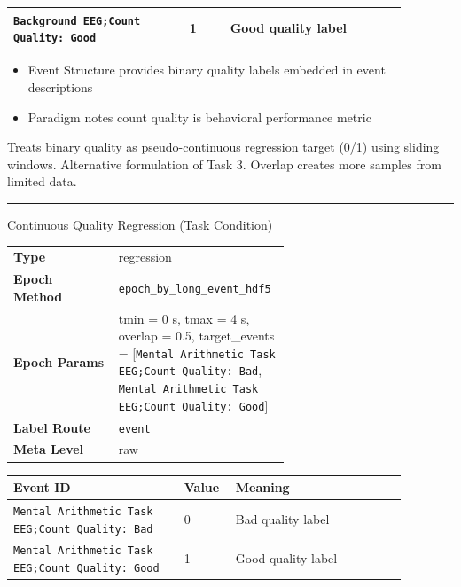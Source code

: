 {\begin{tcolorbox}
\begin{tabular}{@{}p{0.3911\linewidth}p{0.0978\linewidth}p{0.3911\linewidth}@{}}
\texttt{Background EEG;Count Quality: Good} & 1 & Good quality label \\
\bottomrule
\end{tabular}
\endgroup
\par{}\par
\begin{itemize}[leftmargin=1.3em,noitemsep,topsep=1pt]
\item[\scriptsize$\cdot$] {\scriptsize Event Structure provides binary quality labels embedded in event descriptions}
\item[\scriptsize$\cdot$] {\scriptsize Paradigm notes count quality is behavioral performance metric}
\end{itemize}
\par{} {\footnotesize Treats binary quality as pseudo-continuous regression target (0/1) using sliding windows. Alternative formulation of Task 3. Overlap creates more samples from limited data.}
\noindent\rule{\linewidth}{0.4pt}\par\nopagebreak
{} {\footnotesize Continuous Quality Regression (Task Condition)}\par\smallskip
{\footnotesize\begin{tabular}{@{}lp{0.62\linewidth}@{}}
\textbf{Type} & regression \\
\textbf{Epoch Method} & \texttt{epoch\_by\_long\_event\_hdf5} \\
\textbf{Epoch Params} & tmin = 0 s, tmax = 4 s, overlap = 0.5, target\_events = [\texttt{Mental Arithmetic Task EEG;Count Quality: Bad}, \texttt{Mental Arithmetic Task EEG;Count Quality: Good}] \\
\textbf{Label Route} & \texttt{event} \\
\textbf{Meta Level} & raw \\
\end{tabular}}
\par{}\par\smallskip
\begingroup\footnotesize
\begin{tabular}{@{}p{0.3911\linewidth}p{0.0978\linewidth}p{0.3911\linewidth}@{}}
\toprule
\textbf{Event ID} & \textbf{Value} & \textbf{Meaning} \\
\midrule
\texttt{Mental Arithmetic Task EEG;Count Quality: Bad} & 0 & Bad quality label \\
\texttt{Mental Arithmetic Task EEG;Count Quality: Good} & 1 & Good quality label \\

\end{tabular}
\end{tcolorbox}}
